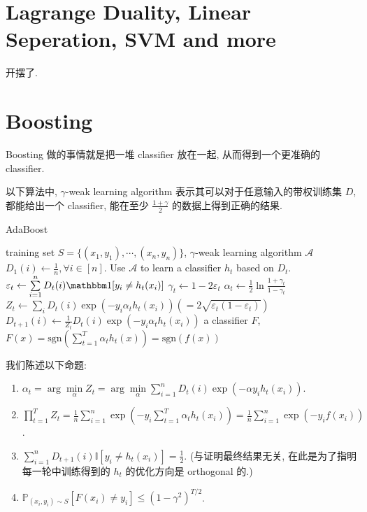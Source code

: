 \documentclass[8pt]{article}
\theoremstyle{compact}
\def\le{\leqslant}
\def\ge{\geqslant}
\begin{document}
\newpage
\section{Lagrange Duality, Linear Seperation, SVM and more}
开摆了.
\newpage
\section{Boosting}

Boosting 做的事情就是把一堆 classifier 放在一起, 从而得到一个更准确的 classifier.

以下算法中, $\gamma$-weak learning algorithm 表示其可以对于任意输入的带权训练集 $D$, 都能给出一个 classifier, 能在至少 $\frac{1 + \gamma}{2}$ 的数据上得到正确的结果.

\begin{algorithm}
	\caption{AdaBoost}
	\begin{algorithmic}[1]
		\Require training set $S = \{(x_1, y_1), \cdots, (x_n, y_n)\}$, $\gamma$-weak learning algorithm $\mathcal A$
		\State $D_1(i) \gets \frac1n, \forall i \in [n]$.
			\State Use $\mathcal A$ to learn a classifier $h_t$ based on $D_t$.
			\State $\varepsilon_t \gets \sum\limits_{i=1}^{n}D_t(i)\mathbbm 1[y_i \neq h_t(x_i)]$
			\State $\gamma_t \gets 1 - 2\varepsilon_t$ \Comment{$\gamma_t \ge \gamma$}
			\State $\alpha_t \gets \frac12 \ln\frac{1 + \gamma_t}{1 - \gamma_t}$
			\State $Z_t \gets \sum_i D_t(i)\exp(-y_i\alpha_th_t(x_i)) \left(= 2\sqrt{\varepsilon_t (1 - \varepsilon_t)}\right)$
			\State $D_{t + 1}(i) \gets \frac{1}{Z_t}D_t(i)\exp(-y_i\alpha_th_t(x_i))$
		\EndFor
		\State \Return a classifier $F$, $F(x) = \text{sgn}\left(\sum\limits_{t=1}^{T}\alpha_th_t(x)\right) = \text{sgn}(f(x))$
	\end{algorithmic}
\end{algorithm}

我们陈述以下命题:
\begin{enumerate}
	\item $\alpha_t = \arg\min\limits_{\alpha}Z_t = \arg\min\limits_{\alpha} \sum\limits_{i=1}^{n}D_t(i)\exp(-\alpha y_i h_t(x_i))$.
	\item $\prod\limits_{t=1}^{T}Z_t = \frac1n \sum\limits_{i=1}^{n}\exp\left(-y_i\sum\limits_{t=1}^{T}\alpha_t h_t(x_i)\right) = \frac1n \sum\limits_{i=1}^{n}\exp\left(-y_if(x_i)\right)$.
	\item $\sum\limits_{i=1}^{n}D_{t+1}(i)\mathbb I[y_i \neq h_t(x_i)] = \frac12$. (与证明最终结果无关, 在此是为了指明每一轮中训练得到的 $h_t$ 的优化方向是 orthogonal 的.)
	\item $\mathbb P_{(x_i, y_i) \sim S} \left[F(x_i) \neq y_i\right] \le (1 - \gamma^2)^{T/2}$.
\end{enumerate}
\end{document}
